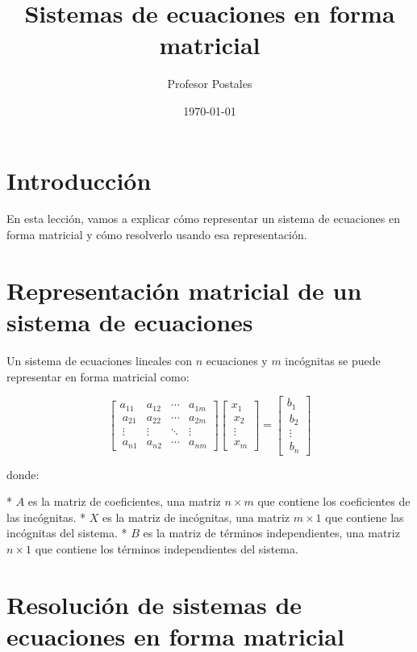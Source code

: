 \documentclass[12pt]{article}
\begin{document}
\title{Sistemas de ecuaciones en forma matricial}
\author{Profesor Postales}
\date{\today}

\maketitle

\section{Introducción}

En esta lección, vamos a explicar cómo representar un sistema de ecuaciones en forma matricial y cómo resolverlo usando esa representación.

\section{Representación matricial de un sistema de ecuaciones}

Un sistema de ecuaciones lineales con $n$ ecuaciones y $m$ incógnitas se puede representar en forma matricial como:

$$\begin{bmatrix} a_{11} & a_{12} & \cdots & a_{1m} \\\ a_{21} & a_{22} & \cdots & a_{2m} \\\ \vdots & \vdots & \ddots & \vdots \\\ a_{n1} & a_{n2} & \cdots & a_{nm} \end{bmatrix} \begin{bmatrix} x_1 \\\ x_2 \\\ \vdots \\\ x_m \end{bmatrix} = \begin{bmatrix} b_1 \\\ b_2 \\\ \vdots \\\ b_n \end{bmatrix}$$

donde:

* $A$ es la matriz de coeficientes, una matriz $n \times m$ que contiene los coeficientes de las incógnitas.
* $X$ es la matriz de incógnitas, una matriz $m \times 1$ que contiene las incógnitas del sistema.
* $B$ es la matriz de términos independientes, una matriz $n \times 1$ que contiene los términos independientes del sistema.

\section{Resolución de sistemas de ecuaciones en forma matricial}
\end{document}
